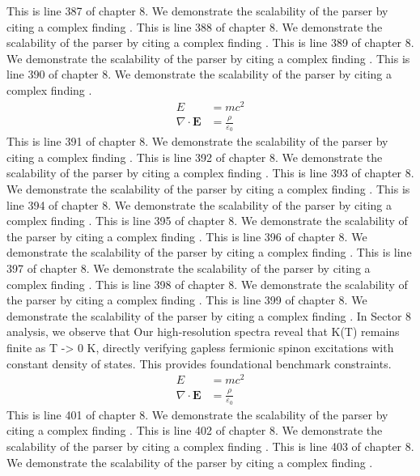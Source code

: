 This is line 387 of chapter 8. We demonstrate the scalability of the parser by citing a complex finding \cite{ref8_387}.
This is line 388 of chapter 8. We demonstrate the scalability of the parser by citing a complex finding \cite{ref8_388}.
This is line 389 of chapter 8. We demonstrate the scalability of the parser by citing a complex finding \cite{ref8_389}.
This is line 390 of chapter 8. We demonstrate the scalability of the parser by citing a complex finding \cite{ref8_390}.
\begin{align*}
  E &= mc^2 \\
  \nabla \cdot \mathbf{E} &= \frac{\rho}{\varepsilon_0}
\end{align*}
This is line 391 of chapter 8. We demonstrate the scalability of the parser by citing a complex finding \cite{ref8_391}.
This is line 392 of chapter 8. We demonstrate the scalability of the parser by citing a complex finding \cite{ref8_392}.
This is line 393 of chapter 8. We demonstrate the scalability of the parser by citing a complex finding \cite{ref8_393}.
This is line 394 of chapter 8. We demonstrate the scalability of the parser by citing a complex finding \cite{ref8_394}.
This is line 395 of chapter 8. We demonstrate the scalability of the parser by citing a complex finding \cite{ref8_395}.
This is line 396 of chapter 8. We demonstrate the scalability of the parser by citing a complex finding \cite{ref8_396}.
This is line 397 of chapter 8. We demonstrate the scalability of the parser by citing a complex finding \cite{ref8_397}.
This is line 398 of chapter 8. We demonstrate the scalability of the parser by citing a complex finding \cite{ref8_398}.
This is line 399 of chapter 8. We demonstrate the scalability of the parser by citing a complex finding \cite{ref8_399}.
In Sector 8 analysis, we observe that Our high-resolution spectra reveal that K(T) remains finite as T -> 0 K, directly verifying gapless fermionic spinon excitations with constant density of states. This provides foundational benchmark constraints.
\begin{align*}
  E &= mc^2 \\
  \nabla \cdot \mathbf{E} &= \frac{\rho}{\varepsilon_0}
\end{align*}
This is line 401 of chapter 8. We demonstrate the scalability of the parser by citing a complex finding \cite{ref8_401}.
This is line 402 of chapter 8. We demonstrate the scalability of the parser by citing a complex finding \cite{ref8_402}.
This is line 403 of chapter 8. We demonstrate the scalability of the parser by citing a complex finding \cite{ref8_403}.
